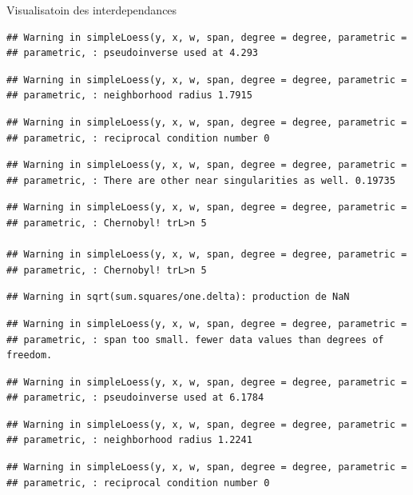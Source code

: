 \documentclass[11pt,ignorenonframetext,]{beamer}
\begin{document}
\begin{frame}[fragile]{Visualisatoin des interdependances}
\begin{verbatim}
## Warning in simpleLoess(y, x, w, span, degree = degree, parametric =
## parametric, : pseudoinverse used at 4.293
\end{verbatim}

\begin{verbatim}
## Warning in simpleLoess(y, x, w, span, degree = degree, parametric =
## parametric, : neighborhood radius 1.7915
\end{verbatim}

\begin{verbatim}
## Warning in simpleLoess(y, x, w, span, degree = degree, parametric =
## parametric, : reciprocal condition number 0
\end{verbatim}

\begin{verbatim}
## Warning in simpleLoess(y, x, w, span, degree = degree, parametric =
## parametric, : There are other near singularities as well. 0.19735
\end{verbatim}

\begin{verbatim}
## Warning in simpleLoess(y, x, w, span, degree = degree, parametric =
## parametric, : Chernobyl! trL>n 5

## Warning in simpleLoess(y, x, w, span, degree = degree, parametric =
## parametric, : Chernobyl! trL>n 5
\end{verbatim}

\begin{verbatim}
## Warning in sqrt(sum.squares/one.delta): production de NaN
\end{verbatim}

\begin{verbatim}
## Warning in simpleLoess(y, x, w, span, degree = degree, parametric =
## parametric, : span too small. fewer data values than degrees of freedom.
\end{verbatim}

\begin{verbatim}
## Warning in simpleLoess(y, x, w, span, degree = degree, parametric =
## parametric, : pseudoinverse used at 6.1784
\end{verbatim}

\begin{verbatim}
## Warning in simpleLoess(y, x, w, span, degree = degree, parametric =
## parametric, : neighborhood radius 1.2241
\end{verbatim}

\begin{verbatim}
## Warning in simpleLoess(y, x, w, span, degree = degree, parametric =
## parametric, : reciprocal condition number 0
\end{verbatim}


\end{frame}
\end{document}
